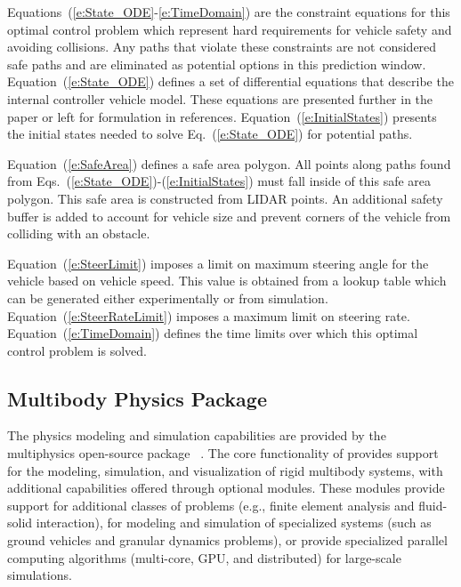 \documentclass[12pt,twocolumn]{article}
\newcommand{\CHRONO}{{\sffamily{{Chrono}}}}
\begin{document}
Equations~(\ref{e:State_ODE}-\ref{e:TimeDomain}) are the constraint equations for this optimal control problem which represent hard requirements for vehicle safety and avoiding collisions. Any paths that violate these constraints are not considered safe paths and are eliminated as potential options in this prediction window. Equation~(\ref{e:State_ODE}) defines a set of differential equations that describe the internal controller vehicle model. These equations are presented further in the paper or left for formulation in references. Equation~(\ref{e:InitialStates}) presents the initial states needed to solve Eq.~(\ref{e:State_ODE}) for potential paths. 

Equation~(\ref{e:SafeArea}) defines a safe area polygon. All points along paths found from Eqs.~(\ref{e:State_ODE})-(\ref{e:InitialStates}) must fall inside of this safe area polygon. This safe area is constructed from LIDAR points. An additional safety buffer is added to account for vehicle size and prevent corners of the vehicle from colliding with an obstacle. 

Equation~(\ref{e:SteerLimit}) imposes a limit on maximum steering angle for the vehicle based on vehicle speed. This value is obtained from a lookup table which can be generated either experimentally or from simulation. Equation~(\ref{e:SteerRateLimit}) imposes a maximum limit on steering rate. Equation~(\ref{e:TimeDomain}) defines the time limits over which this optimal control problem is solved.


\subsection{{\CHRONO} Multibody Physics Package}\label{ss:Chrono}

The physics modeling and simulation capabilities are provided by the multiphysics open-source package {\CHRONO}~\cite{Chrono2016}. The core functionality of {\CHRONO} provides support for the modeling, simulation, and visualization of rigid multibody systems, with additional capabilities offered through optional modules. These modules provide support for additional classes of problems (e.g., finite element analysis and fluid-solid interaction), for modeling and simulation of specialized systems (such as ground vehicles and granular dynamics problems), or provide specialized parallel computing algorithms (multi-core, GPU, and distributed) for large-scale simulations.
\end{document}
